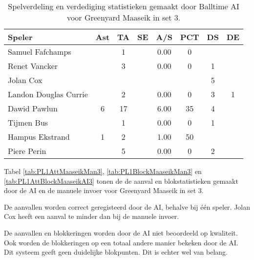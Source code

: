 \begin{table}[ht!]
  \centering
  \scriptsize
  \begin{tabular}{|l|c|c|c|c|c|c|c|} \hline
    \textbf{Speler} & Ast & TA & SE & A/S & PCT & DS & DE \\ \hline
    Samuel Fafchamps &  & 1 &  & 0.00 & 0 &  &  \\
    Renet Vancker &  & 3 &  & 0.00 & 0 & 1 &  \\
    Jolan Cox &  &  &  &  &  & 5 &  \\
    Landon Douglas Currie &  & 2 &  & 0.00 & 0 & 3 & 1 \\
    Dawid Pawlun & 6 & 17 &  & 6.00 & 35 & 4 &  \\
    Tijmen Bus &  & 1 &  & 0.00 & 0 & 1 &  \\
    Hampus Ekstrand & 1 & 2 &  & 1.00 & 50 &  &  \\
    Piere Perin &  & 5 &  & 0.00 & 0 & 2 &  \\  \hline
  \end{tabular}
  \caption[Spelverdelings- en verdedigingsstatistieken gemaakt door Balltime AI voor Greenyard Maaseik in set 3]{\label{tab:PL1SetDigMaaseikAI3}Spelverdeling en verdediging statistieken gemaakt door Balltime AI voor Greenyard Maaseik in set 3.}
\end{table}

Tabel \ref{tab:PL1AttMaaseikMan3}, \ref{tab:PL1BlockMaaseikMan3} en \ref{tab:PL1AttBlockMaaseikAI3} tonen de de aanval en blokstatistieken gemaakt door de AI en de manuele invoer voor Greenyard Maaseik in set 3. 

De aanvallen worden correct geregisteerd door de AI, behalve bij één speler. Jolan Cox heeft een aanval te minder dan bij de manuele invoer. 

De aanvallen en blokkeringen worden door de AI niet beoordeeld op kwaliteit. Ook worden de blokkeringen op een totaal andere manier bekeken door de AI. Dit systeem geeft geen duidelijke blokpunten. Dit is echter wel van belang.

